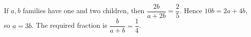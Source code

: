 If $a,b$ families have one and two children, then $\dfrac{2b}{a+2b}=\dfrac{2}{5}$. Hence $10b=2a+4b$, so $a=3b$. The required fraction is $\dfrac{b}{a+b}=\boxed{\dfrac{1}{4}}$.
